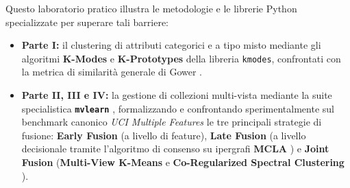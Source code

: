 Questo laboratorio pratico illustra le metodologie e le librerie Python specializzate per superare tali barriere:
\begin{itemize}
    \item \textbf{Parte I:} il clustering di attributi categorici e a tipo misto mediante gli algoritmi \textbf{K-Modes} e \textbf{K-Prototypes} \cite{huang1998} della libreria \texttt{kmodes}, confrontati con la metrica di similarità generale di Gower \cite{gower1971}.
    \item \textbf{Parte II, III e IV:} la gestione di collezioni multi-vista mediante la suite specialistica \textbf{\texttt{mvlearn}} \cite{perry2021}, formalizzando e confrontando sperimentalmente sul benchmark canonico \textit{UCI Multiple Features} le tre principali strategie di fusione: \textbf{Early Fusion} (a livello di feature), \textbf{Late Fusion} (a livello decisionale tramite l'algoritmo di consenso su ipergrafi \textbf{MCLA} \cite{strehl2002}) e \textbf{Joint Fusion} (\textbf{Multi-View K-Means} e \textbf{Co-Regularized Spectral Clustering} \cite{kumar2011}).
\end{itemize}

